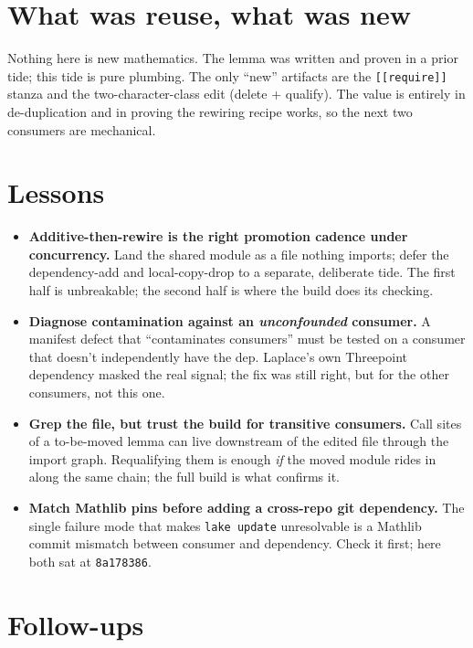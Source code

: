 \documentclass[11pt]{article}
\renewcommand{\_}{\textunderscore\allowbreak}
\begin{document}
\section{What was reuse, what was new}

Nothing here is new mathematics. The lemma was written and proven in a prior
tide; this tide is pure plumbing. The only ``new'' artifacts are the
\texttt{[[require]]} stanza and the two-character-class edit (delete + qualify).
The value is entirely in de-duplication and in proving the rewiring recipe
works, so the next two consumers are mechanical.

\section{Lessons}

\begin{itemize}[leftmargin=1.4em]
  \item \textbf{Additive-then-rewire is the right promotion cadence under
    concurrency.} Land the shared module as a file nothing imports; defer the
    dependency-add and local-copy-drop to a separate, deliberate tide. The first
    half is unbreakable; the second half is where the build does its checking.
  \item \textbf{Diagnose contamination against an \emph{unconfounded} consumer.}
    A manifest defect that ``contaminates consumers'' must be tested on a
    consumer that doesn't independently have the dep. Laplace's own Threepoint
    dependency masked the real signal; the fix was still right, but for the
    other consumers, not this one.
  \item \textbf{Grep the file, but trust the build for transitive consumers.}
    Call sites of a to-be-moved lemma can live downstream of the edited file
    through the import graph. Requalifying them is enough \emph{if} the moved
    module rides in along the same chain; the full build is what confirms it.
  \item \textbf{Match Mathlib pins before adding a cross-repo git dependency.}
    The single failure mode that makes \texttt{lake update} unresolvable is a
    Mathlib commit mismatch between consumer and dependency. Check it first;
    here both sat at \texttt{8a178386}.
\end{itemize}

\section{Follow-ups}
\end{document}
